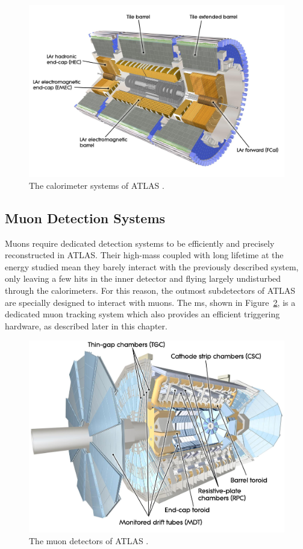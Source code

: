 \begin{figure}[!h]
  \centering
  \includegraphics[width=\textwidth]{Images/ATLAS/ATLASCalo.jpg}
  \caption{The calorimeter systems of ATLAS \cite{ATLASschematics}.}
  \label{fig-AtlasDecCalo}
\end{figure}

\subsection{Muon Detection Systems}
Muons require dedicated detection systems to be efficiently and precisely reconstructed in ATLAS. Their high-mass coupled with long lifetime at the energy studied mean they barely interact with the previously described system, only leaving a few hits in the inner detector and flying largely undisturbed through the calorimeters. For this reason, the outmost subdetectors of ATLAS are specially designed to interact with muons. The \gls{ms}, shown in Figure~\ref{fig-AtlasDecMuon}, is a dedicated muon tracking system which also provides an efficient triggering hardware, as described later in this chapter. 

\begin{figure}[!h]
  \centering
  \includegraphics[width=\textwidth]{Images/ATLAS/ATLASMuon.jpg}
  \caption{The muon detectors of ATLAS \cite{ATLASschematics}.}
  \label{fig-AtlasDecMuon}
\end{figure}

